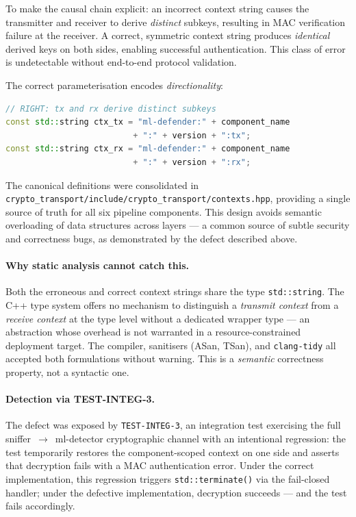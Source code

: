 \documentclass[11pt,a4paper]{article}
\begin{document}
    To make the causal chain explicit: an incorrect context string causes the
    transmitter and receiver to derive \emph{distinct} subkeys, resulting in
    MAC verification failure at the receiver. A correct, symmetric context string
    produces \emph{identical} derived keys on both sides, enabling successful
    authentication. This class of error is undetectable without end-to-end
    protocol validation.

    The correct parameterisation encodes \emph{directionality}:

    \begin{lstlisting}[language=C++, caption={Correct HKDF context --- channel-scoped},
        basicstyle=\ttfamily\small, breaklines=true]
// RIGHT: tx and rx derive distinct subkeys
const std::string ctx_tx = "ml-defender:" + component_name
                          + ":" + version + ":tx";
const std::string ctx_rx = "ml-defender:" + component_name
                          + ":" + version + ":rx";
    \end{lstlisting}

    The canonical definitions were consolidated in
    \texttt{crypto\_transport/include/crypto\_transport/contexts.hpp},
    providing a single source of truth for all six pipeline components.
    This design avoids semantic overloading of data structures across layers ---
    a common source of subtle security and correctness bugs, as demonstrated by
    the defect described above.

    \paragraph{Why static analysis cannot catch this.}
    Both the erroneous and correct context strings share the type
    \texttt{std::string}. The C++ type system offers no mechanism to distinguish
    a \emph{transmit context} from a \emph{receive context} at the type level
    without a dedicated wrapper type --- an abstraction whose overhead is not
    warranted in a resource-constrained deployment target. The compiler,
    sanitisers (ASan, TSan), and \texttt{clang-tidy} all accepted both
    formulations without warning. This is a \emph{semantic} correctness
    property, not a syntactic one.

    \paragraph{Detection via TEST-INTEG-3.}
    The defect was exposed by \texttt{TEST-INTEG-3}, an integration test
    exercising the full sniffer~$\to$~ml-detector cryptographic channel with an
    intentional regression: the test temporarily restores the component-scoped
    context on one side and asserts that decryption fails with a MAC
    authentication error. Under the correct implementation, this regression
    triggers \texttt{std::terminate()} via the fail-closed handler; under the
    defective implementation, decryption succeeds --- and the test fails
    accordingly.
\end{document}
